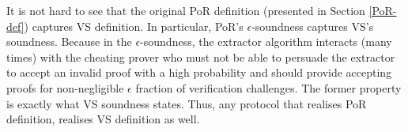 \begin{remark}
It is not hard to see that the original PoR definition (presented in Section \ref{PoR-def}) captures VS definition. In particular, PoR's $\epsilon$-soundness captures VS's soundness.  Because in the $\epsilon$-soundness, the extractor algorithm interacts (many times) with the cheating prover  who must not be able to persuade the extractor to accept an invalid proof with a high probability and should provide  accepting proofs for non-negligible $\epsilon$ fraction of verification challenges.  The former property is exactly what VS soundness states. Thus, any protocol that realises PoR definition, realises VS definition as well. 
\end{remark}



